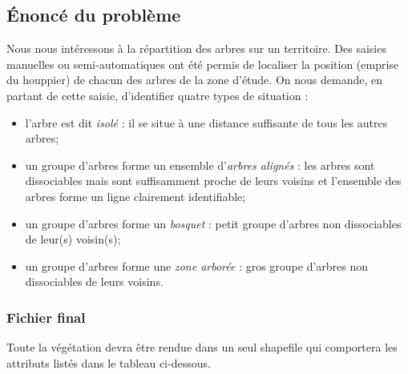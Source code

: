 \documentclass[11pt]{article}
\begin{document}
\subsection{Énoncé du problème}

Nous nous intéressons à la répartition des arbres sur un territoire. Des saisies manuelles ou semi-automatiques ont été permis de localiser la position (emprise du houppier) de chacun des arbres de la zone d'étude. On nous demande, en partant de cette saisie, d'identifier quatre types de situation :
\begin{itemize}
	\item l'arbre est dit \textit{isolé} : il se situe à une distance suffisante de tous les autres arbres;
	\item un groupe d'arbres forme un ensemble d'\textit{arbres alignés} : les arbres sont dissociables mais sont suffisamment proche de leurs voisins et l'ensemble des arbres forme un ligne clairement identifiable;
	\item un groupe d'arbres forme un \textit{bosquet} : petit groupe d'arbres non dissociables de leur(s) voisin(s);
	\item un groupe d'arbres forme une \textit{zone arborée} : gros groupe d'arbres non dissociables de leurs voisins.
\end{itemize}

\subsubsection{Fichier final}

Toute la végétation devra être rendue dans un seul shapefile qui comportera les attributs listés dans le tableau ci-dessous.
\end{document}
